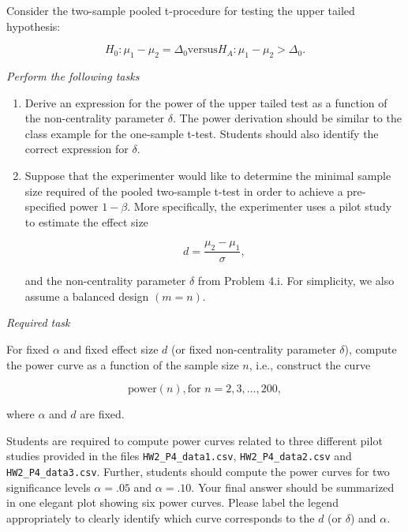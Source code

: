 \documentclass[letterpaper]{article}
\begin{document}
	Consider the two-sample pooled t-procedure for testing the upper tailed hypothesis:
	
	\[
	H_0 : \mu_1 - \mu_2 = \Delta_0
	\text{versus} 
	H_A : \mu_1 - \mu_2 > \Delta_0.
	\]
	
	\medskip
	
	\emph{Perform the following tasks}
	
	\begin{enumerate}
		
		\item[i] Derive an expression for the power of the upper tailed test as a function of the non-centrality parameter $\delta$. The power derivation should be similar to the class example for the one-sample t-test. Students should also identify the correct expression for $\delta$.
		
		\item[ii] Suppose that the experimenter would like to determine the minimal sample size required of the pooled two-sample t-test in order to achieve a pre-specified power $1-\beta$. More specifically, the experimenter uses a pilot study to estimate the effect size
		
		\[
		d=\frac{\mu_2-\mu_1}{\sigma},
		\]
		
		and the non-centrality parameter $\delta$ from Problem 4.i. For simplicity, we also assume a balanced design $(m=n)$.
		
	\end{enumerate}
	
	\medskip
	
	\emph{Required task}
	
	\medskip
	
	For fixed $\alpha$ and fixed effect size $d$ (or fixed non-centrality parameter $\delta$), compute the power curve as a function of the sample size $n$, i.e., construct the curve
	
	\[
	\text{power}(n),  \text{for } n=2,3,\dots,200,
	\]
	
	where $\alpha$ and $d$ are fixed.
	
	Students are required to compute power curves related to three different pilot studies provided in the files \texttt{HW2\_P4\_data1.csv}, \texttt{HW2\_P4\_data2.csv} and \texttt{HW2\_P4\_data3.csv}. Further, students should compute the power curves for two significance levels $\alpha=.05$ and $\alpha=.10$. Your final answer should be summarized in one elegant plot showing six power curves. Please label the legend appropriately to clearly identify which curve corresponds to the $d$ (or $\delta$) and $\alpha$.
	
\end{document}
